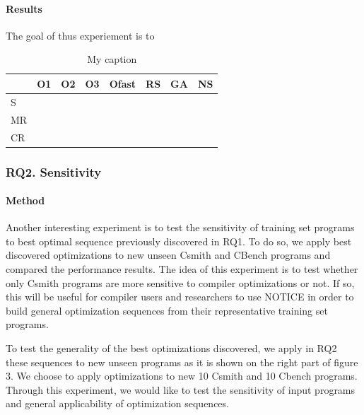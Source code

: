 \paragraph{Results}
The goal of thus experiement is to 
\begin{table}[h]
	\centering
	\caption{My caption}
	\label{my-label}
	\begin{tabular}{|l|l|l|l|l|l|l|c|}
		\hline
		& O1                    & O2                    & O3                    & Ofast                 & RS                    & GA                    & NS \\ \hline
		S  & \multicolumn{1}{c|}{} & \multicolumn{1}{c|}{} & \multicolumn{1}{c|}{} & \multicolumn{1}{c|}{} & \multicolumn{1}{c|}{} & \multicolumn{1}{c|}{} &    \\ \hline
		MR &                       &                       &                       &                       &                       &                       &    \\ \hline
		CR &                       &                       &                       &                       &                       &                       &    \\ \hline
	\end{tabular}
\end{table}
\subsubsection{RQ2. Sensitivity}
\paragraph{Method}
Another interesting experiment is to test the sensitivity of training set programs to best optimal sequence previously discovered in RQ1. To do so, we apply best discovered optimizations to new unseen Csmith and CBench programs and compared the performance results. The idea of this experiment is to test whether only Csmith programs are more sensitive to compiler optimizations or not. If so, this will be useful for compiler users and researchers to use NOTICE in order to build general optimization sequences from their representative training set programs.



To test the generality of the best optimizations discovered, we apply in RQ2 these sequences to new unseen programs as it is shown on the right part of figure 3. We choose to apply optimizations to new 10 Csmith and 10 Cbench programs. Through this experiment, we would like to test the sensitivity of input programs and general applicability of optimization sequences.
